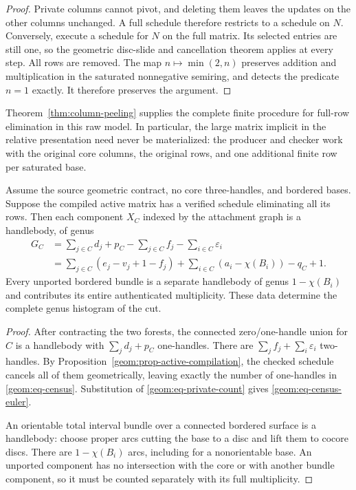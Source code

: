 \begin{proof}
Private columns cannot pivot, and deleting them leaves the updates
on the other columns unchanged.  A full schedule therefore restricts
to a schedule on $N$.  Conversely, execute a schedule for $N$ on the
full matrix.  Its selected entries are still one, so the geometric
disc-slide and cancellation theorem applies at every step.  All rows
are removed.  The map $n\mapsto\min(2,n)$ preserves addition and
multiplication in the saturated nonnegative semiring, and detects
the predicate $n=1$ exactly.  It therefore preserves the argument.
\end{proof}

Theorem~\ref{thm:column-peeling} supplies the complete finite procedure
for full-row elimination in this raw model.  In particular, the
large matrix implicit in the relative presentation need never be
materialized: the producer and checker work with the original
core columns, the original rows, and one additional finite row per
saturated base.

\begin{theorem}
\label{geom:thm-census}
Assume the source geometric contract, no core three-handles, and
bordered bases.  Suppose the compiled active matrix has a verified
schedule eliminating all its rows.  Then each component $X_C$
indexed by the attachment graph is a handlebody, of genus
\begin{align}
 G_C
 &=\sum_{j\in C}d_j+p_C-\sum_{j\in C}f_j
     -\sum_{i\in C}\varepsilon_i
 \label{geom:eq-census}\\
 &=\sum_{j\in C}(e_j-v_j+1-f_j)
   +\sum_{i\in C}(a_i-\chi(B_i))-q_C+1.
 \label{geom:eq-census-euler}
\end{align}
Every unported bordered bundle is a separate handlebody of genus
$1-\chi(B_i)$ and contributes its entire authenticated multiplicity.
These data determine the complete genus histogram of the cut.
\end{theorem}

\begin{proof}
After contracting the two forests, the connected zero/one-handle
union for $C$ is a handlebody with
$\sum_jd_j+p_C$ one-handles.  There are
$\sum_jf_j+\sum_i\varepsilon_i$ two-handles.  By
Proposition~\ref{geom:prop-active-compilation}, the checked schedule
cancels all of them geometrically, leaving exactly the number of
one-handles in \eqref{geom:eq-census}.  Substitution of
\eqref{geom:eq-private-count} gives
\eqref{geom:eq-census-euler}.

An orientable total interval bundle over a connected bordered
surface is a handlebody: choose proper arcs cutting the base to a
disc and lift them to cocore discs.  There are $1-\chi(B_i)$ arcs,
including for a nonorientable base.  An unported component has no
intersection with the core or with another bundle component, so it
must be counted separately with its full multiplicity.
\end{proof}

